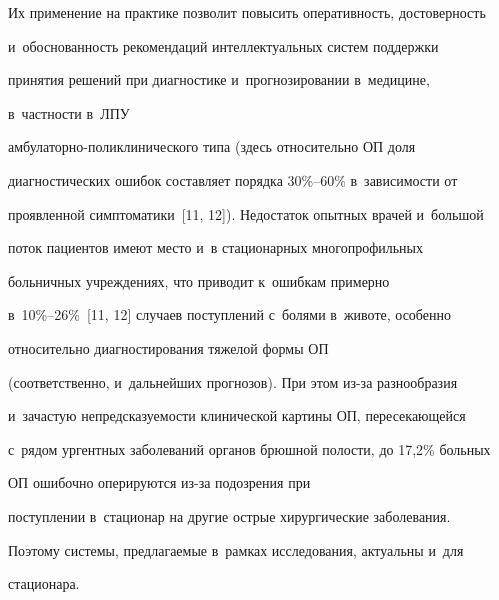 Их применение на практике позволит повысить оперативность, достоверность 

и~обоснованность рекомендаций интеллектуальных систем поддержки 

принятия решений при диагностике и~прогнозировании в~медицине, 

в~частности в~ЛПУ 

ам\-бу\-ла\-тор\-но-по\-ли\-кли\-ни\-че\-ско\-го типа (здесь относительно ОП доля 

диагностических ошибок составляет порядка 30\%--60\% в~зависимости от 

проявленной симптоматики~[11, 12]). Недостаток опытных врачей и~большой 

поток пациентов имеют место и~в стационарных многопрофильных 

больничных учреждениях, что приводит к~ошибкам примерно 

 в~10\%--26\%~[11, 12] случаев поступлений с~болями в~животе, особенно 

относительно диагностирования тяжелой формы ОП

(соответственно, и~дальнейших прогнозов). При этом из-за разнообразия 

и~зачастую непредсказуемости клинической картины ОП, пересекающейся 

с~рядом ургентных заболеваний органов брюшной полости, до 17,2\% больных 

ОП ошибочно оперируются из-за подозрения при 

поступлении в~стационар на другие острые хирургические заболевания. 

Поэтому системы, предлагаемые в~рамках исследования, актуальны и~для 

стационара.



\vspace*{-6pt}

  


